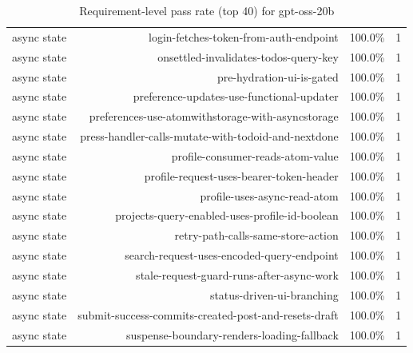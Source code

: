 \begin{table}[htbp]
\begin{tabular}{lrrr}
async state & login-fetches-token-from-auth-endpoint & 100.0\% & 1 \\
async state & onsettled-invalidates-todos-query-key & 100.0\% & 1 \\
async state & pre-hydration-ui-is-gated & 100.0\% & 1 \\
async state & preference-updates-use-functional-updater & 100.0\% & 1 \\
async state & preferences-use-atomwithstorage-with-asyncstorage & 100.0\% & 1 \\
async state & press-handler-calls-mutate-with-todoid-and-nextdone & 100.0\% & 1 \\
async state & profile-consumer-reads-atom-value & 100.0\% & 1 \\
async state & profile-request-uses-bearer-token-header & 100.0\% & 1 \\
async state & profile-uses-async-read-atom & 100.0\% & 1 \\
async state & projects-query-enabled-uses-profile-id-boolean & 100.0\% & 1 \\
async state & retry-path-calls-same-store-action & 100.0\% & 1 \\
async state & search-request-uses-encoded-query-endpoint & 100.0\% & 1 \\
async state & stale-request-guard-runs-after-async-work & 100.0\% & 1 \\
async state & status-driven-ui-branching & 100.0\% & 1 \\
async state & submit-success-commits-created-post-and-resets-draft & 100.0\% & 1 \\
async state & suspense-boundary-renders-loading-fallback & 100.0\% & 1 \\
\bottomrule
\end{tabular}
\caption{Requirement-level pass rate (top 40) for gpt-oss-20b}
\end{table}
